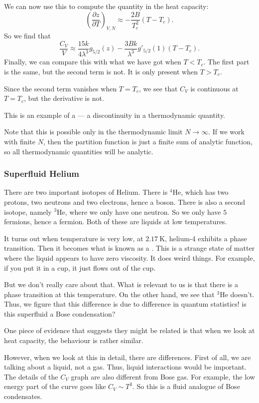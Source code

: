 \documentclass[a4paper]{article}
\begin{document}
We can now use this to compute the quantity in the heat capacity:
\[
  \left(\frac{\partial z}{\partial T}\right)_{V, N} \approx -\frac{2B}{T_c^2}(T - T_c).
\]
So we find that
\[
  \frac{C_V}{V} \approx \frac{15 k}{4 \lambda^3} g_{5/2}(z) - \frac{3Bk}{\lambda^3} g'_{5/2}(1) (T - T_c).
\]
Finally, we can compare this with what we have got when $T < T_c$. The first part is the same, but the second term is not. It is only present when $T > T_c$.

Since the second term vanishes when $T = T_c$, we see that $C_V$ is continuous at $T = T_c$, but the derivative is not. %

This is an example of a  --- a discontinuity in a thermodynamic quantity.

Note that this is possible only in the thermodynamic limit $N \to \infty$. If we work with finite $N$, then the partition function is just a finite sum of analytic function, so all thermodynamic quantities will be analytic.

\subsubsection*{Superfluid Helium}
There are two important isotopes of Helium. There is $^4$He, which has two protons, two neutrons and two electrons, hence a boson. There is also a second isotope, namely $^3$He, where we only have one neutron. So we only have $5$ fermions, hence a fermion. Both of these are liquids at low temperatures.

It turns out when temperature is very low, at $\SI{2.17}{\kelvin}$, helium-4 exhibits a phase transition. Then it becomes what is known as a . This is a strange state of matter where the liquid appears to have zero viscosity. It does weird things. For example, if you put it in a cup, it just flows out of the cup.

But we don't really care about that. What is relevant to us is that there is a phase transition at this temperature. On the other hand, we see that $^3$He doesn't. Thus, we figure that this difference is due to difference in quantum statistics! is this superfluid a Bose condensation?

One piece of evidence that suggests they might be related is that when we look at heat capacity, the behaviour is rather similar. %

However, when we look at this in detail, there are differences. First of all, we are talking about a liquid, not a gas. Thus, liquid interactions would be important. The details of the $C_V$ graph are also different from Bose gas. For example, the low energy part of the curve goes like $C_V \sim T^3$. So this is a fluid analogue of Bose condensates.
\end{document}
